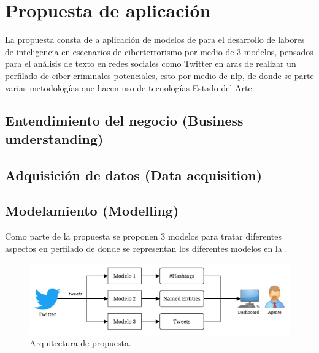 
\chapter{Propuesta de aplicación} %

\label{chap:proposal} %


\newcommand{\nmodels}{{3 }}

La propuesta consta de a aplicación de modelos de  para el desarrollo de labores de inteligencia en escenarios de ciberterrorismo por medio de \nmodels modelos, pensados para el análisis de texto en redes sociales como Twitter en aras de realizar un perfilado de ciber-criminales potenciales, esto por medio de \gls{nlp}, de donde se parte varias metodologías que hacen uso de tecnologías \mbox{Estado-del-Arte}.

\section{Entendimiento del negocio (Business understanding)}

\section{Adquisición de datos (Data acquisition)}

\section{Modelamiento (Modelling)}
Como parte de la propuesta se proponen \nmodels modelos para tratar diferentes aspectos en perfilado de donde se representan los diferentes modelos en la .

\begin{figure}[H]
  \centering
  \includegraphics[width=\textwidth]{Figures/general-architecture.pdf}
\decoRule
\caption[Arquitectura de propuesta]{Arquitectura de propuesta.}
\label{fig:proposal-arch}
\end{figure}


